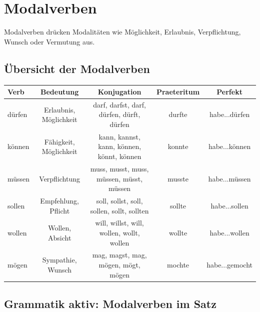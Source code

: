 \chapter{Modalverben}
\label{cha:Modalverben}

Modalverben drücken Modalitäten wie Möglichkeit, Erlaubnis, Verpflichtung, Wunsch oder Vermutung aus.

\section{Übersicht der Modalverben}
\label{sec:ModalverbenUebersicht}

\begin{center}
\begin{tabular}{|l|c|c|c|c|}
\hline
\textbf{Verb} & \textbf{Bedeutung} & \textbf{Konjugation} & \textbf{Praeteritum} & \textbf{Perfekt} \\ \hline
dürfen & Erlaubnis, Möglichkeit & darf, darfst, darf, dürfen, dürft, dürfen & durfte & habe...dürfen \\ \hline
können & Fähigkeit, Möglichkeit & kann, kannst, kann, können, könnt, können & konnte & habe...können \\ \hline
müssen & Verpflichtung & muss, musst, muss, müssen, müsst, müssen & musste & habe...müssen \\ \hline
sollen & Empfehlung, Pflicht & soll, sollst, soll, sollen, sollt, sollten & sollte & habe...sollen \\ \hline
wollen & Wollen, Absicht & will, willst, will, wollen, wollt, wollen & wollte & habe...wollen \\ \hline
mögen & Sympathie, Wunsch & mag, magst, mag, mögen, mögt, mögen & mochte & habe...gemocht \\ \hline
\end{tabular}
\end{center}

\section{Grammatik aktiv: Modalverben im Satz}
\label{sec:ModalverbenSatz}

